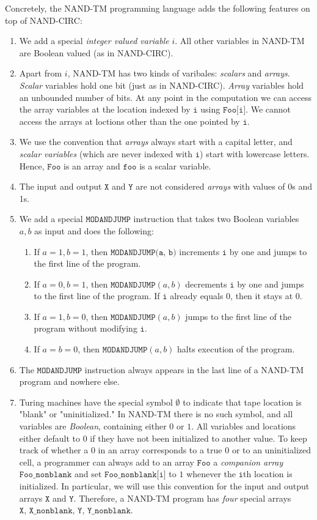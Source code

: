   Concretely, the NAND-TM programming language adds the following features on top of NAND-CIRC: 
  \begin{enumerate}
      \item We add a special \textit{integer valued variable} $i$. All other variables in NAND-TM are Boolean valued (as in NAND-CIRC). 
      \item Apart from $i$, NAND-TM has two kinds of varibales: \textit{scalars} and \textit{arrays}. \textit{Scalar} variables hold one bit (just as in NAND-CIRC). \textit{Array} variables hold an unbounded number of bits. At any point in the computation we can access the array variables at the location indexed by $\texttt{i}$ using $\texttt{Foo[i]}$. We cannot access the arrays at loctions other than the one pointed by $\texttt{i}$. 
      \item We use the convention that \textit{arrays} always start with a capital letter, and \textit{scalar variables} (which are never indexed with $\texttt{i}$) start with lowercase letters. Hence, $\texttt{Foo}$ is an array and $\texttt{foo}$ is a scalar variable. 
      \item The input and output $\texttt{X}$ and $\texttt{Y}$ are not considered \textit{arrays} with values of 0s and 1s. 
      \item We add a special $\texttt{MODANDJUMP}$ instruction that takes two Boolean variables $a, b$ as input and does the following:  
      \begin{enumerate}
          \item If $a = 1, b = 1$, then $\texttt{MODANDJUMP(a, b)}$ increments $\texttt{i}$ by one and jumps to the first line of the program. 
          \item If $a = 0, b = 1$, then $\texttt{MODANDJUMP}(a, b)$ decrements $\texttt{i}$ by one and jumps to the first line of the program. If $\texttt{i}$ already equals 0, then it stays at 0.
          \item If $a = 1, b = 0$, then $\texttt{MODANDJUMP}(a, b)$ jumps to the first line of the program without modifying $\texttt{i}$. 
          \item If $a = b = 0$, then $\texttt{MODANDJUMP}(a, b)$ halts execution of the program.
      \end{enumerate}
      \item The $\texttt{MODANDJUMP}$ instruction always appears in the last line of a NAND-TM program and nowhere else. 
      \item Turing machines have the special symbol $\emptyset$ to indicate that tape location is "blank" or "uninitialized." In NAND-TM there is no such symbol, and all variables are \textit{Boolean}, containing either $0$ or $1$. All variables and locations either default to $0$ if they have not been initialized to another value. To keep track of whether a $0$ in an array corresponds to a true 0 or to an uninitialized cell, a programmer can always add to an array $\texttt{Foo}$ a \textit{companion array} $\texttt{Foo\_nonblank}$ and set $\texttt{Foo\_nonblank[i]}$ to $1$ whenever the $\texttt{i}$th location is initialized. In particular, we will use this convention for the input and output arrays $\texttt{X}$ and $\texttt{Y}$. Therefore, a NAND-TM program has \textit{four} special arrays $\texttt{X, X\_nonblank, Y, Y\_nonblank}$. 

\end{enumerate}
